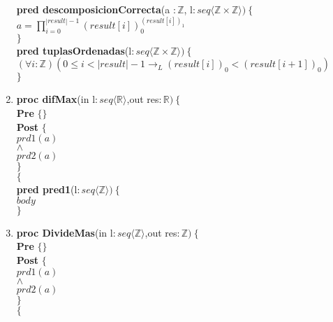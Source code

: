 \documentclass[a4paper]{article}
\begin{document}
\begin{enumerate}[label=\alph*)]
			\textbf{pred descomposicionCorrecta}(a $:\mathbb{Z}$,
			l$:seq\langle \mathbb{Z} \times \mathbb{Z}\rangle)\ 
			\{$\smallskip \\
			\hspace*{6mm}$a=\prod_{i=0}^{|result|-1}(result[i])_{0}^{(result[i])_1}$\\
			$\}$\smallskip \\	
			
			\textbf{pred tuplasOrdenadas}(l$:seq\langle \mathbb{Z} \times \mathbb{Z}
			\rangle)\ \{$\smallskip \\
			\hspace*{6mm}$(\forall i:\mathbb{Z})(0\leq i <|result|-1\rightarrow_L 
				(result[i])_0<(result[i+1])_0)$\\
			$\}$\smallskip \\	
			
		\item
			
			\textbf{proc difMax}(in l$:seq\langle \mathbb{R}\rangle$,out res$:\mathbb{R} )\ 
			\{$\smallskip \\
			\hspace*{6mm} \textbf{Pre }$\{ \}$\smallskip \\
			\hspace*{6mm} \textbf{Post }$\{$\\
			\hspace*{6mm} $prd1(a)$\\
			\hspace*{6mm} $\wedge$\\
			\hspace*{6mm} $prd2(a)$\\
			\hspace*{6mm} $\}$\\
			$\{$\smallskip \\
			
			\textbf{pred pred1}(l$: seq\langle \mathbb{Z}\rangle)\ \{$\smallskip \\
			\hspace*{6mm}$body$\\
			$\}$	
			
		\item
			
			\textbf{proc DivideMas}(in l$:seq\langle \mathbb{Z}\rangle$,out res$:\mathbb{Z} )\ 
			\{$\smallskip \\
			\hspace*{6mm} \textbf{Pre }$\{ \}$\smallskip \\
			\hspace*{6mm} \textbf{Post }$\{$\\
			\hspace*{6mm} $prd1(a)$\\
			\hspace*{6mm} $\wedge$\\
			\hspace*{6mm} $prd2(a)$\\
			\hspace*{6mm} $\}$\\
			$\{$\smallskip \\
			

\end{enumerate}
\end{document}

